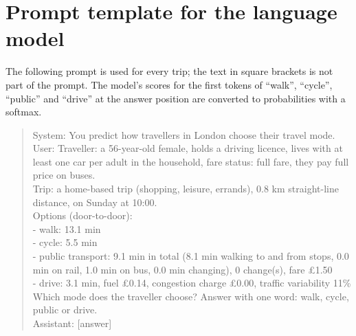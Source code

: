 \documentclass[11pt,a4paper]{article}
\begin{document}
\appendix
\section{Prompt template for the language model}
\label{app:prompt}
The following prompt is used for every trip; the text in square brackets is not part of the prompt. The model's scores for the first tokens of ``walk'', ``cycle'', ``public'' and ``drive'' at the answer position are converted to probabilities with a softmax.
\begin{quote}\small\ttfamily
System: You predict how travellers in London choose their travel mode.\\[0.3em]
User: Traveller: a 56-year-old female, holds a driving licence, lives with at least one car per adult in the household, fare status: full fare, they pay full price on buses.\\
Trip: a home-based trip (shopping, leisure, errands), 0.8 km straight-line distance, on Sunday at 10:00.\\
Options (door-to-door):\\
- walk: 13.1 min\\
- cycle: 5.5 min\\
- public transport: 9.1 min in total (8.1 min walking to and from stops, 0.0 min on rail, 1.0 min on bus, 0.0 min changing), 0 change(s), fare \pounds1.50\\
- drive: 3.1 min, fuel \pounds0.14, congestion charge \pounds0.00, traffic variability 11\%\\
Which mode does the traveller choose? Answer with one word: walk, cycle, public or drive.\\[0.3em]
Assistant: [answer]
\end{quote}
\end{document}
